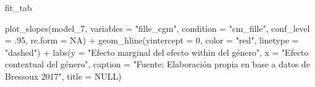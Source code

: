 \documentclass[
  12pt,
  a4paper,
]{article}
\newenvironment{Shaded}{\begin{snugshade}}{\end{snugshade}}
\newcommand{\AttributeTok}[1]{\textcolor[rgb]{0.77,0.63,0.00}{#1}}
\newcommand{\ConstantTok}[1]{\textcolor[rgb]{0.00,0.00,0.00}{#1}}
\newcommand{\DecValTok}[1]{\textcolor[rgb]{0.00,0.00,0.81}{#1}}
\newcommand{\FunctionTok}[1]{\textcolor[rgb]{0.00,0.00,0.00}{#1}}
\newcommand{\NormalTok}[1]{#1}
\newcommand{\SpecialCharTok}[1]{\textcolor[rgb]{0.00,0.00,0.00}{#1}}
\newcommand{\StringTok}[1]{\textcolor[rgb]{0.31,0.60,0.02}{#1}}
\begin{document}
\begin{Shaded}
\begin{Highlighting}[]
\NormalTok{fit\_tab}

\FunctionTok{plot\_slopes}\NormalTok{(model\_7, }
            \AttributeTok{variables =} \StringTok{"fille\_cgm"}\NormalTok{, }
            \AttributeTok{condition =} \StringTok{"cm\_fille"}\NormalTok{,}
            \AttributeTok{conf\_level =}\NormalTok{ .}\DecValTok{95}\NormalTok{,}
            \AttributeTok{re.form =} \ConstantTok{NA}\NormalTok{) }\SpecialCharTok{+}
  \FunctionTok{geom\_hline}\NormalTok{(}\AttributeTok{yintercept =} \DecValTok{0}\NormalTok{, }
             \AttributeTok{color =} \StringTok{"red"}\NormalTok{, }
             \AttributeTok{linetype =} \StringTok{"dashed"}\NormalTok{) }\SpecialCharTok{+}
  \FunctionTok{labs}\NormalTok{(}\AttributeTok{y =} \StringTok{"Efecto marginal del efecto within del género"}\NormalTok{,}
       \AttributeTok{x =} \StringTok{"Efecto contextual del género"}\NormalTok{,}
       \AttributeTok{caption =} \StringTok{"Fuente: Elaboración propia en base a datos de Bressoux 2017"}\NormalTok{,}
       \AttributeTok{title =} \ConstantTok{NULL}\NormalTok{)}
\end{Highlighting}
\end{Shaded}
\end{document}
